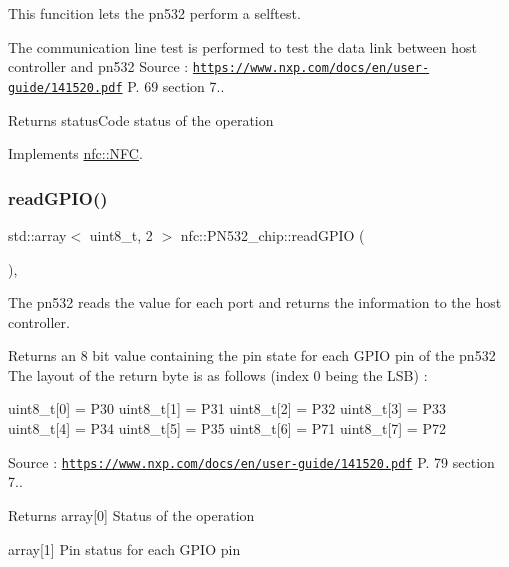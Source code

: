 This funcition lets the pn532 perform a selftest. 

The communication line test is performed to test the data link between host controller and pn532 Source \+: \href{https://www.nxp.com/docs/en/user-guide/141520.pdf}{\tt https\+://www.\+nxp.\+com/docs/en/user-\/guide/141520.\+pdf} P. 69 section 7.. \begin{DoxyReturn}{Returns}
status\+Code status of the operation 
\end{DoxyReturn}


Implements \hyperlink{classnfc_1_1NFC_ac23474442d2bc8e35ee583c1390386eb}{nfc\+::\+N\+FC}.

\mbox{\label{classnfc_1_1PN532__chip_a1c7e2ace0798d1e6b11bbab4a5e632c5}} 
\subsubsection{\texorpdfstring{read\+G\+P\+I\+O()}{readGPIO()}}
{\footnotesize\ttfamily std\+::array$<$ uint8\+\_\+t, 2 $>$ nfc\+::\+P\+N532\+\_\+chip\+::read\+G\+P\+IO (\begin{DoxyParamCaption}{ }\end{DoxyParamCaption})\hspace{0.3cm}{\ttfamily [override]}, {\ttfamily [virtual]}}



The pn532 reads the value for each port and returns the information to the host controller. 

Returns an 8 bit value containing the pin state for each G\+P\+IO pin of the pn532 The layout of the return byte is as follows (index 0 being the L\+SB) \+: \begin{DoxyVerb}uint8_t[0] = P30 
uint8_t[1] = P31
uint8_t[2] = P32
uint8_t[3] = P33
uint8_t[4] = P34
uint8_t[5] = P35
uint8_t[6] = P71
uint8_t[7] = P72
\end{DoxyVerb}


Source \+: \href{https://www.nxp.com/docs/en/user-guide/141520.pdf}{\tt https\+://www.\+nxp.\+com/docs/en/user-\/guide/141520.\+pdf} P. 79 section 7.. \begin{DoxyReturn}{Returns}
array\mbox{[}0\mbox{]} Status of the operation 

array\mbox{[}1\mbox{]} Pin status for each G\+P\+IO pin 
\end{DoxyReturn}


